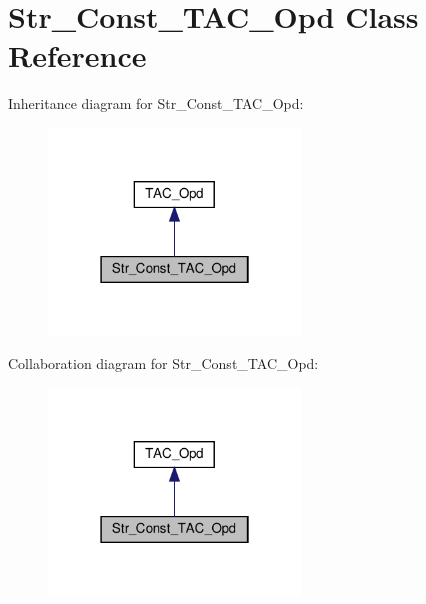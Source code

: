 \hypertarget{classStr__Const__TAC__Opd}{}\section{Str\+\_\+\+Const\+\_\+\+T\+A\+C\+\_\+\+Opd Class Reference}
\label{classStr__Const__TAC__Opd}


Inheritance diagram for Str\+\_\+\+Const\+\_\+\+T\+A\+C\+\_\+\+Opd\+:
\nopagebreak
\begin{figure}[H]
\begin{center}
\leavevmode
\includegraphics[width=190pt]{classStr__Const__TAC__Opd__inherit__graph}
\end{center}
\end{figure}


Collaboration diagram for Str\+\_\+\+Const\+\_\+\+T\+A\+C\+\_\+\+Opd\+:
\nopagebreak
\begin{figure}[H]
\begin{center}
\leavevmode
\includegraphics[width=190pt]{classStr__Const__TAC__Opd__coll__graph}
\end{center}
\end{figure}

